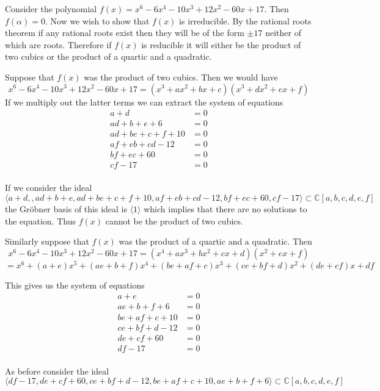 \documentclass[10pt]{article}
\newcommand{\bb}[1]{\mathbb{#1}}
\theoremstyle{plain}
\theoremstyle{remark}
\begin{document}
Consider the polynomial $f(x)=x^{6} - 6 x^{4} - 10 x^{3} + 12 x^{2} - 60 x + 17$. Then $f(\alpha)=0$.
Now we wish to show that $f(x)$ is irreducible. By the rational roots theorem
if any rational roots exist then they will be of the form $\pm 17$ neither of which are
roots. Therefore if $f(x)$ is reducible it will either be the product of two cubics or
the product of a quartic and a quadratic.

Suppose that $f(x)$ was the product of two cubics. Then we would have
\[ x^{6} - 6 x^{4} - 10 x^{3} + 12 x^{2} - 60 x + 17 = (x^3+ax^2+bx+c)(x^3+dx^2+ex+f) \]
If we multiply out the latter terms we can extract the system of equations
\begin{align*}
  a+d &=0\\
  ad+b+e +6 &= 0\\
  ad+be+c+f+10&= 0\\
  af+eb+cd-12&= 0\\
  bf+ec+60&= 0\\
  cf - 17 &= 0\\
\end{align*}

If we consider the ideal
\[\langle a+d,,ad+b+e,ad+be+c+f+10,af+eb+cd-12,bf+ec+60,cf-17\rangle\subset \bb{C}[a,b,c,d,e,f]\]
the Gr\"obner basis of this ideal is $\langle 1\rangle$ which implies that there are no solutions
to the equation. Thus $f(x)$ cannot be the product of two cubics.

Similarly suppose that $f(x)$ was the product of a quartic and a quadratic.
Then
\[ x^{6} - 6 x^{4} - 10 x^{3} + 12 x^{2} - 60 x + 17 = (x^4+ax^3+bx^2+cx+d)(x^2+ex+f)\]
  \[=x^{6} + \left(a + e\right) x^{5} + \left(a e + b + f\right) x^{4} + \left(b e + a f + c\right) x^{3} + \left(c e + b f + d\right) x^{2} + \left(d e + c f\right) x + d f \]

This gives us the system of equations
\begin{align*}
  a+e&= 0\\
  ae+b+f+6&= 0\\
  be+af+c+10&= 0\\
  ce+bf+d-12&= 0\\
  de+cf+60&= 0\\
  df -17&= 0\\
\end{align*}

As before consider the ideal
\[ \langle d f - 17, d e + c f + 60, c e + b f + d - 12, b e + a f + c + 10, a e + b + f + 6\rangle
  \subset \bb{C}[a,b,c,d,e,f] \]
\end{document}
